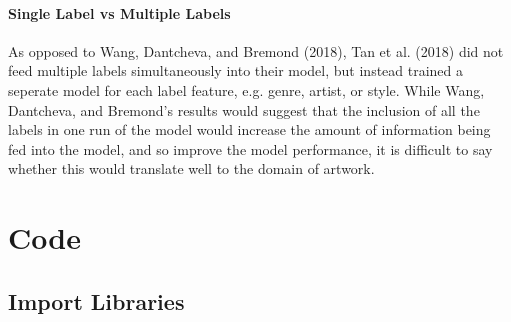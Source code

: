 \documentclass[11pt]{article}
\begin{document}
\paragraph{Single Label vs Multiple
Labels}\label{single-label-vs-multiple-labels}

As opposed to Wang, Dantcheva, and Bremond (2018), Tan et al. (2018) did
not feed multiple labels simultaneously into their model, but instead
trained a seperate model for each label feature, e.g. genre, artist, or
style. While Wang, Dantcheva, and Bremond's results would suggest that
the inclusion of all the labels in one run of the model would increase
the amount of information being fed into the model, and so improve the
model performance, it is difficult to say whether this would translate
well to the domain of artwork.

\newpage
    \section*{Code}\label{code}

    \subsection{Import Libraries}\label{import-libraries}
\end{document}
